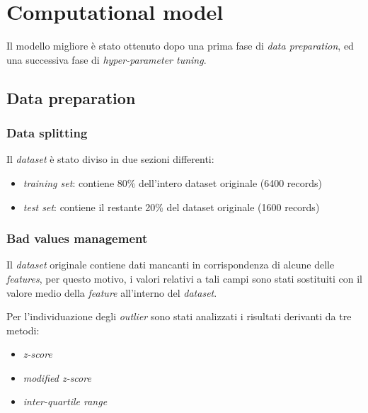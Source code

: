 \section{Computational model}

        Il modello migliore è stato ottenuto dopo una prima fase di \textit{data preparation}, ed una successiva fase di \textit{hyper-parameter tuning}.

        \subsection{Data preparation}
        
                \subsubsection{Data splitting}
                
                        Il \textit{dataset} è stato diviso in due sezioni differenti:
                        \begin{itemize}
                                \item \textit{training set}: contiene 80\% dell'intero dataset originale (6400 records)
                                \item \textit{test set}: contiene il restante 20\% del dataset originale (1600 records)
                        \end{itemize}
                
                \subsubsection{Bad values management}
                
                        Il \textit{dataset} originale contiene dati mancanti in corrispondenza di alcune delle \textit{features}, per questo motivo, i valori relativi a tali campi sono stati sostituiti con il valore medio della \textit{feature} all'interno del \textit{dataset}.
                        \bigbreak
                        
                        Per l'individuazione degli \textit{outlier} sono stati analizzati i risultati derivanti da tre metodi:
                        \begin{itemize}
                            \item \textit{z-score}
                            \item \textit{modified z-score}
                            \item \textit{inter-quartile range}
                        \end{itemize}
                        

